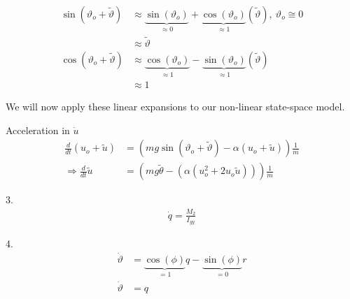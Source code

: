 \begin{align*}
	\sin(\vartheta_o+\tilde{\vartheta}) &\approx \underbrace{\sin(\vartheta_o)}_{\approx 0}+\underbrace{\cos(\vartheta_o)}_{\approx 1}(\tilde\vartheta),\:\vartheta_o\cong 0\\
	&\approx \tilde{\vartheta}\\
	\cos(\vartheta_o+\tilde{\vartheta}) &\approx \underbrace{\cos(\vartheta_o)}_{\approx 1}-\underbrace{\sin(\vartheta_o)}_{\approx 1}(\tilde\vartheta)\\
	&\approx 1
\end{align*}

We will now apply these linear expansions to our non-linear state-space model.

Acceleration in $\dot{u}$
\begin{align*}
\frac{d}{dt}(u_o+\tilde{u}) &= \left(mg \sin(\vartheta_o + \tilde{\vartheta}) - \alpha(u_o+\tilde{u})\right)\frac{1}{m}\\
\Rightarrow\frac{d}{dt}\tilde{u}&=\left(mg\tilde\theta-(\alpha(u_o^2+2u_o\tilde{u}))\right)\frac{1}{m}
\end{align*}

3.
\begin{align*}
\dot{q}=\frac{M_2}{I_{yy}}
\end{align*}

4.
\begin{align*}
\dot\vartheta&=\underbrace{\cos(\phi)}_{=1}q-\underbrace{\sin(\phi)}_{=0}r\\
\dot\vartheta&=q
\end{align*}

